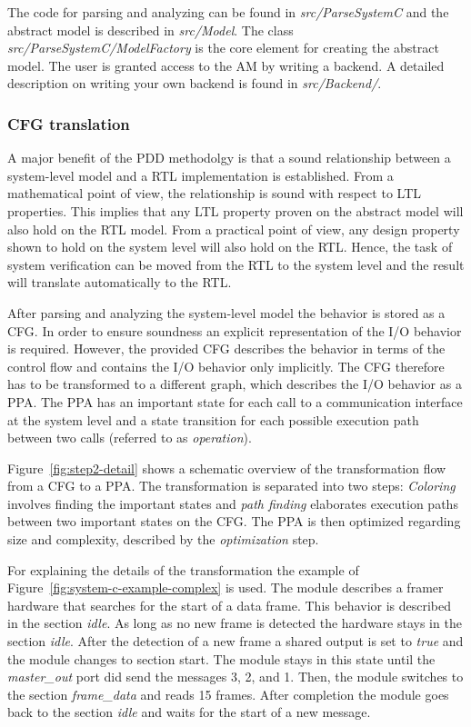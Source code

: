 The code for parsing and analyzing can be found in \textit{src/ParseSystemC} and the abstract model is described in \textit{src/Model}.  
The class \textit{src/ParseSystemC/ModelFactory} is the core element for creating the abstract model. 
The user is granted access to the AM by writing a backend.
A detailed description on writing your own backend is found in \textit{src/Backend/}. 

\subsubsection{CFG translation}

A major benefit of the PDD methodolgy is that a sound relationship between a system-level model and a RTL implementation is established. 
From a mathematical point of view, the relationship is sound with respect to LTL properties. This implies that any LTL property proven on the abstract model will also hold on the RTL model. 
From a practical point of view, any design property shown to hold on the system level will also hold on the RTL. 
Hence, the task of system verification can be moved from the RTL to the system level and the result will translate automatically to the RTL. 

After parsing and analyzing the system-level model the behavior is stored as a CFG. 
In order to ensure soundness an explicit representation of the I/O behavior is required. However, the provided CFG describes the behavior in terms of the control flow and contains the I/O behavior only implicitly.
The CFG therefore has to be transformed to a different graph, which describes the I/O behavior as a PPA. 
The PPA has an important state for each call to a communication interface at the system level and a state transition for each possible execution path between two calls (referred to as \textit{operation}).  

Figure~\ref{fig:step2-detail} shows a schematic overview of the transformation flow from a CFG to a PPA.
The transformation is separated into two steps: \textit{Coloring} involves finding the important states and \textit{path finding} elaborates execution paths between two important states on the CFG. 
The PPA is then optimized regarding size and complexity, described by the \textit{optimization} step. 


For explaining the details of the transformation the example of Figure~\ref{fig:system-c-example-complex} is used. 
The module describes a framer hardware that searches for the start of a data frame. 
This behavior is described in the section \textit{idle}.
As long as no new frame is detected the hardware stays in the section \textit{idle}. 
After the detection of a new frame a shared output is set to \textit{true} and the module changes to section start. 
The module stays in this state until the \textit{master\_out} port did send the messages 3, 2, and 1. 
Then, the module switches to the section \textit{frame\_data} and reads 15 frames. 
After completion the module goes back to the section \textit{idle} and waits for the start of a new message. 


